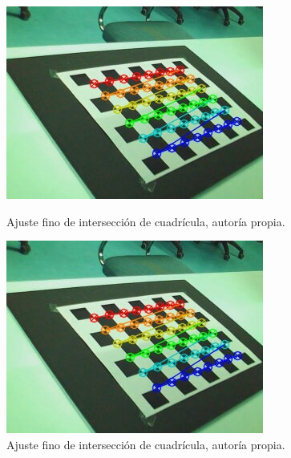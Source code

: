 \documentclass[a4paper,12pt]{article}
\begin{document}
{\vspace{0.5cm}


\begin{figure}[h!]
    \centering
    \begin{minipage}[b]{0.45\textwidth}
        \centering
        \includegraphics[width=\textwidth]{fonts/fine_0.jpg}
        \caption{Ajuste fino de intersección de cuadrícula, autoría propia.}
        \label{fig:izquierda1}
    \end{minipage}
    \hfill
    \begin{minipage}[b]{0.45\textwidth}
        \centering
        \includegraphics[width=\textwidth]{fonts/not_fine_0.jpg}
        \caption{Ajuste fino de intersección de cuadrícula, autoría propia.}
        \label{fig:derecha1}
    \end{minipage}


\end{figure}}
\end{document}
